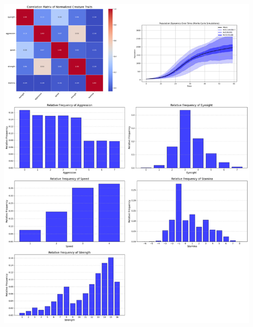 \documentclass{article}
\begin{document}
\begin{center}
    \includegraphics[scale=0.21]{tests/2.10.jpg}
\end{center}
\end{document}
